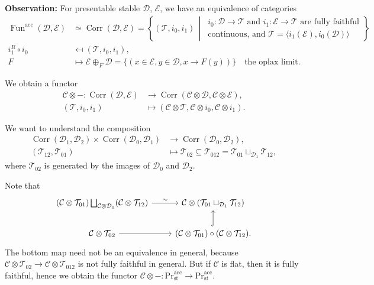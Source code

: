 \documentclass[draft]{amsart}
\newcommand{\set}[2]{\left\{#1\,\middle|\,#2\right\}}
\newcommand{\cat}[1]{\mathcal{#1}}
\renewcommand{\Pr}{\mathrm{Pr}}
\newcommand{\blank}{-} %
\DeclareMathOperator{\Fun}{Fun}
\DeclareMathOperator{\Corr}{Corr}
\theoremstyle{definition}
\begin{document}
\textbf{Observation:} For presentable stable $\cat D$, $\cat E$, we have an equivalence of categories
\begin{align*}
\Fun^{\mathrm{acc}}(\cat D, \cat E) &\simeq \Corr(\cat D, \cat E) = \set{(\cat T,i_0,i_1)}{\begin{array}{l} \text{$i_0\colon \cat D\to \cat T$ and $i_1\colon \cat E\to \cat T$ are fully faithful} \\
\text{continuous, and $\cat T = \langle i_1(\cat E), i_0(\cat D)\rangle$}
\end{array}} \\
i_1^R\circ i_0 &\mapsfrom (\cat T,i_0,i_1), \\
F &\mapsto \cat E\oplus_{F}\cat D = \{(x\in \cat E, y\in \cat D, x\to F(y))\}
\quad \text{the oplax limit}.
\end{align*}

We obtain a functor
\begin{align*}
\cat C\otimes\blank \colon \Corr(\cat D, \cat E) &\to \Corr(\cat C\otimes \cat D, \cat C\otimes \cat E), \\
(\cat T, i_0, i_1) &\mapsto (\cat C\otimes \cat T, \cat C\otimes i_0, \cat C\otimes i_1).
\end{align*}

We want to understand the composition
\begin{align*}
\Corr(\cat D_1,\cat D_2) \times \Corr(\cat D_0, \cat D_1) &\to \Corr(\cat D_0, \cat D_2), \\
(\cat T_{12}, \cat T_{01}) &\mapsto \cat T_{02} \subseteq \cat T_{012} = \cat T_{01} \sqcup_{\cat D_1} \cat T_{12},
\end{align*}
where $\cat T_{02}$ is generated by the images of $\cat D_0$ and $\cat D_2$.

Note that
\[
\begin{tikzcd}
(\cat C\otimes \cat T_{01}) \bigsqcup_{\cat C\otimes \cat D_1} (\cat C\otimes \cat T_{12}) \ar[r,"\sim"] & \cat C \otimes (\cat T_{01} \sqcup_{\cat D_1} \cat T_{12}) \\
\cat C\otimes \cat T_{02} \ar[r] & (\cat C\otimes \cat T_{01}) \circ (\cat C\otimes \cat T_{12}) \ar[u,hook].
\end{tikzcd}
\]
The bottom map need not be an equivalence in general, because $\cat C\otimes \cat T_{02} \to \cat C\otimes \cat T_{012}$ is not fully faithful in general. But if $\cat C$ is flat, then it is fully faithful, hence we obtain the functor $\cat C\otimes \blank \colon \Pr^{\mathrm{acc}}_{\mathrm{st}} \to \Pr^{\mathrm{acc}}_{\mathrm{st}}$.
\end{document}

